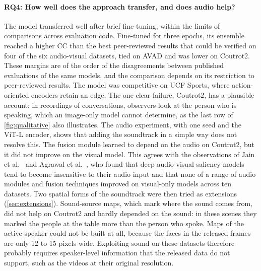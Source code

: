 \paragraph{RQ4: How well does the approach transfer, and does audio help?} The
model transferred well after brief fine-tuning, within the limits of comparisons
across evaluation code. Fine-tuned for three epochs, its ensemble reached a
higher \acrshort{CC} than the best peer-reviewed results that could be verified on four of
the six audio-visual datasets, tied on AVAD and was lower on Coutrot2. These
margins are of the order of the disagreements between published evaluations of
the same models, and the comparison depends on its restriction to peer-reviewed
results. The model was competitive on UCF Sports, where action-oriented encoders
retain an edge. The one clear failure, Coutrot2, has a plausible account: in
recordings of conversations, observers look at the person who is speaking,
which an image-only model cannot determine, as the last row of
\cref{fig:qualitative} also illustrates. The audio experiment, with one seed and
the \acrshort{ViT}-L encoder, shows that adding the soundtrack in a simple way does not
resolve this. The fusion module
learned to depend on the audio on Coutrot2, but it did not improve on the visual
model. This agrees with the observations of Jain et al.~\cite{jain2021vinet} and
Agrawal et al.~\cite{agrawal2022does}, who found that deep audio-visual saliency
models tend to become insensitive to their audio input and that none of a range
of audio modules and fusion techniques improved on visual-only models across
ten datasets. Two spatial forms of the soundtrack were then tried as extensions
(\cref{sec:extensions}). Sound-source maps, which mark where the sound comes
from, did not help on Coutrot2 and hardly depended on the sound: in these
scenes they marked the people at the table more than the person who spoke.
Maps of the active speaker could not be built at all, because the faces in the
released frames are only 12 to 15 pixels wide. Exploiting sound on these
datasets therefore probably requires speaker-level information that the
released data do not support, such as the videos at their original
resolution.

